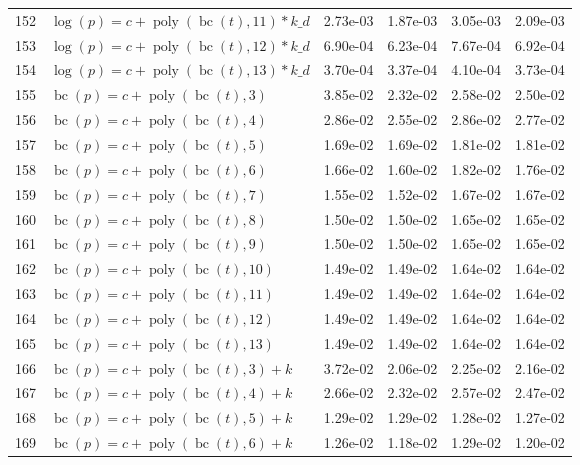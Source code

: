 \documentclass[12pt,a4paper]{article}
\DeclareMathOperator{\bc}{bc}
\DeclareMathOperator{\poly}{poly}
\begin{document}
\begin{longtable}[t]{ll>{\raggedleft\arraybackslash}p{2cm}>{\raggedleft\arraybackslash}p{2cm}>{\raggedleft\arraybackslash}p{2cm}>{\raggedleft\arraybackslash}p{2cm}}
152 & $\log(p) = c + \poly\left( \bc(t), 11 \right) * k\_d$ & 2.73e-03 & 1.87e-03 & 3.05e-03 & 2.09e-03\\
\rowcolor{gray!6}  153 & $\log(p) = c + \poly\left( \bc(t), 12 \right) * k\_d$ & 6.90e-04 & 6.23e-04 & 7.67e-04 & 6.92e-04\\
154 & $\log(p) = c + \poly\left( \bc(t), 13 \right) * k\_d$ & 3.70e-04 & 3.37e-04 & 4.10e-04 & 3.73e-04\\
\rowcolor{gray!6}  155 & $\bc(p) = c + \poly\left( \bc(t), 3 \right)$ & 3.85e-02 & 2.32e-02 & 2.58e-02 & 2.50e-02\\
156 & $\bc(p) = c + \poly\left( \bc(t), 4 \right)$ & 2.86e-02 & 2.55e-02 & 2.86e-02 & 2.77e-02\\
\rowcolor{gray!6}  157 & $\bc(p) = c + \poly\left( \bc(t), 5 \right)$ & 1.69e-02 & 1.69e-02 & 1.81e-02 & 1.81e-02\\
158 & $\bc(p) = c + \poly\left( \bc(t), 6 \right)$ & 1.66e-02 & 1.60e-02 & 1.82e-02 & 1.76e-02\\
\rowcolor{gray!6}  159 & $\bc(p) = c + \poly\left( \bc(t), 7 \right)$ & 1.55e-02 & 1.52e-02 & 1.67e-02 & 1.67e-02\\
160 & $\bc(p) = c + \poly\left( \bc(t), 8 \right)$ & 1.50e-02 & 1.50e-02 & 1.65e-02 & 1.65e-02\\
\rowcolor{gray!6}  161 & $\bc(p) = c + \poly\left( \bc(t), 9 \right)$ & 1.50e-02 & 1.50e-02 & 1.65e-02 & 1.65e-02\\
162 & $\bc(p) = c + \poly\left( \bc(t), 10 \right)$ & 1.49e-02 & 1.49e-02 & 1.64e-02 & 1.64e-02\\
\rowcolor{gray!6}  163 & $\bc(p) = c + \poly\left( \bc(t), 11 \right)$ & 1.49e-02 & 1.49e-02 & 1.64e-02 & 1.64e-02\\
164 & $\bc(p) = c + \poly\left( \bc(t), 12 \right)$ & 1.49e-02 & 1.49e-02 & 1.64e-02 & 1.64e-02\\
\rowcolor{gray!6}  165 & $\bc(p) = c + \poly\left( \bc(t), 13 \right)$ & 1.49e-02 & 1.49e-02 & 1.64e-02 & 1.64e-02\\
166 & $\bc(p) = c + \poly\left( \bc(t), 3 \right) + k$ & 3.72e-02 & 2.06e-02 & 2.25e-02 & 2.16e-02\\
\rowcolor{gray!6}  167 & $\bc(p) = c + \poly\left( \bc(t), 4 \right) + k$ & 2.66e-02 & 2.32e-02 & 2.57e-02 & 2.47e-02\\
168 & $\bc(p) = c + \poly\left( \bc(t), 5 \right) + k$ & 1.29e-02 & 1.29e-02 & 1.28e-02 & 1.27e-02\\
\rowcolor{gray!6}  169 & $\bc(p) = c + \poly\left( \bc(t), 6 \right) + k$ & 1.26e-02 & 1.18e-02 & 1.29e-02 & 1.20e-02\\

\end{longtable}
\end{document}
